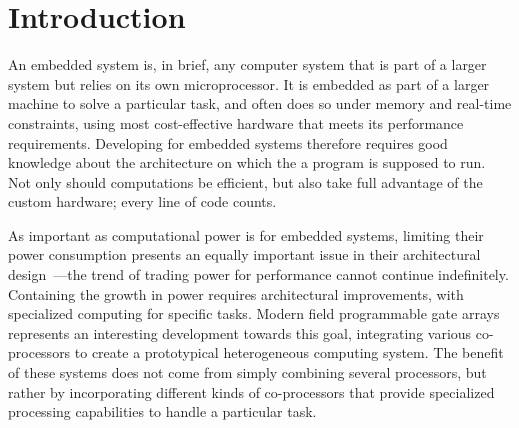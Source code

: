 \documentclass[../paper.tex]{subfiles}
\begin{document}
\chapter{Introduction}
\label{intro}

An embedded system is, in brief, any computer system that is part of a larger system but relies on its own microprocessor. It is embedded as part of a larger machine to solve a particular task, and often does so under memory and real-time constraints, using most cost-effective hardware that meets its performance requirements. Developing for embedded systems therefore requires good knowledge about the architecture on which the a program is supposed to run. Not only should computations be efficient, but also take full advantage of the custom hardware; every line of code counts.




As important as computational power is for embedded systems, limiting their power consumption presents an equally important issue in their architectural design~\cite{mudge2001}---the trend of trading power for performance cannot continue indefinitely. Containing the growth in power requires architectural improvements, with specialized computing for specific tasks. Modern field programmable gate arrays represents an interesting development towards this goal, integrating various co-processors to create a prototypical heterogeneous computing system. The benefit of these systems does not come from simply combining several processors, but rather by incorporating different kinds of co-processors that provide specialized processing capabilities to handle a particular task.
\end{document}

